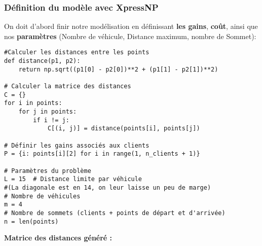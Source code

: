 \documentclass[a4paper, 12pt, DIV=12]{scrartcl}
\begin{document}
\subsubsection{Définition du modèle avec XpressNP}
On doit d'abord finir notre modélisation en définissant \textbf{les gains}, \textbf{coût}, ainsi que nos \textbf{paramètres} (Nombre de véhicule, Distance maximum, nombre de Sommet):
\begin{verbatim}
#Calculer les distances entre les points
def distance(p1, p2):
    return np.sqrt((p1[0] - p2[0])**2 + (p1[1] - p2[1])**2)

# Calculer la matrice des distances
C = {}
for i in points:
    for j in points:
        if i != j:
            C[(i, j)] = distance(points[i], points[j])

# Définir les gains associés aux clients
P = {i: points[i][2] for i in range(1, n_clients + 1)}

# Paramètres du problème
L = 15  # Distance limite par véhicule 
#(La diagonale est en 14, on leur laisse un peu de marge)
# Nombre de véhicules
m = 4  
# Nombre de sommets (clients + points de départ et d'arrivée)
n = len(points)  

\end{verbatim}
\textbf{Matrice des distances généré :}\\[10pt]
\end{document}
